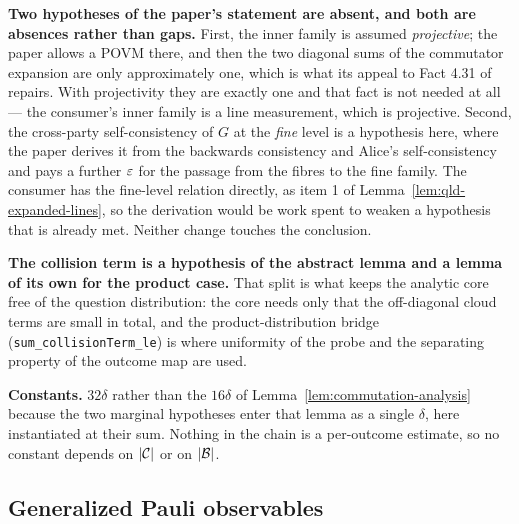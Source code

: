 \textbf{Two hypotheses of the paper's statement are absent, and both are absences rather than
gaps.} First, the inner family is assumed \emph{projective}; the paper allows a POVM there, and
then the two diagonal sums of the commutator expansion are only approximately one, which is what
its appeal to Fact 4.31 of~\cite{NW19} repairs. With projectivity they are exactly one and that
fact is not needed at all --- the consumer's inner family is a line measurement, which is
projective. Second, the cross-party self-consistency of $G$ at the \emph{fine} level is a
hypothesis here, where the paper derives it from the backwards consistency and Alice's
self-consistency and pays a further $\varepsilon$ for the passage from the fibres to the fine family. The
consumer has the fine-level relation directly, as item 1 of
Lemma~\ref{lem:qld-expanded-lines}, so the derivation would be work spent to weaken a hypothesis
that is already met. Neither change touches the conclusion.

\textbf{The collision term is a hypothesis of the abstract lemma and a lemma of its own for the
product case.} That split is what keeps the analytic core free of the question distribution: the
core needs only that the off-diagonal cloud terms are small in total, and the product-distribution
bridge (\texttt{sum\_collisionTerm\_le}) is where uniformity of the probe and the separating
property of the outcome map are used.

\textbf{Constants.} $32\delta$ rather than the $16\delta$ of
Lemma~\ref{lem:commutation-analysis} because the two marginal hypotheses enter that lemma as a
single $\delta$, here instantiated at their sum. Nothing in the chain is a per-outcome estimate,
so no constant depends on $|\mathcal{C}|$ or on $|\mathcal{B}|$.

\subsection{Generalized Pauli observables}

